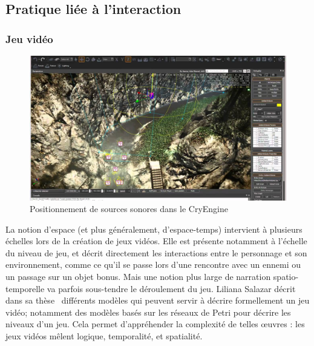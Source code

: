 \documentclass[french,12pt]{article}
\begin{document}
\subsection{Pratique liée à l'interaction}

\subsubsection{Jeu vidéo}
\begin{figure}[h]
    \centering
    \includegraphics[scale=0.25]{images/cryengine.jpg}
    \caption{Positionnement de sources sonores dans le CryEngine}
    \label{fig.cryengine}
\end{figure}
La notion d'espace (et plus généralement, d'espace-temps) intervient à plusieurs échelles lors de la création de jeux vidéos. 
Elle est présente notamment à l'échelle du niveau de jeu, et décrit directement les interactions entre le personnage et son environnement, 
comme ce qu'il se passe lors d'une rencontre avec un ennemi ou un passage sur un objet bonus. 
Mais une notion plus large de narration spatio-temporelle va parfois sous-tendre le déroulement du jeu.
Liliana Salazar décrit dans sa thèse~\cite{salazar_modelisation_2004} différents modèles qui peuvent servir à décrire 
formellement un jeu vidéo; notamment des modèles basés sur les réseaux de Petri pour décrire les niveaux d'un jeu. 
Cela permet d'appréhender la complexité de telles œuvres : les jeux vidéos mêlent logique, temporalité, et spatialité.
\end{document}
